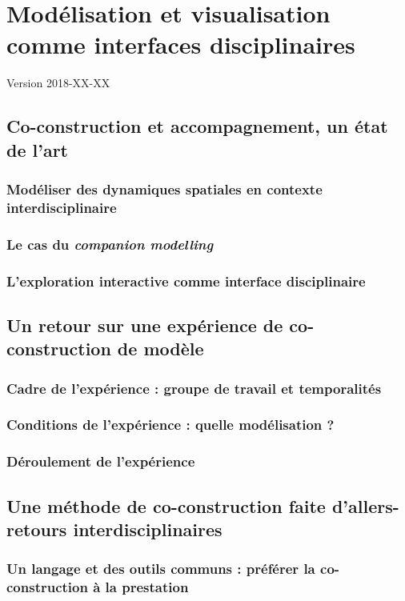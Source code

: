 \chapter{Modélisation et visualisation comme interfaces disciplinaires}
\label{chap:chap1}
\begin{center}
	{\large Version 2018-XX-XX}	\end{center}
\minitoc

\section{Co-construction et accompagnement, un état de l'art}
\subsection{Modéliser des dynamiques spatiales en contexte interdisciplinaire}
\subsection{Le cas du \textit{companion modelling}}
\subsection{L'exploration interactive comme interface disciplinaire}

\section{Un retour sur une expérience de co-construction de modèle}
\subsection{Cadre de l'expérience : groupe de travail et temporalités}
\subsection{Conditions de l'expérience : quelle modélisation ?}
\subsection{Déroulement de l'expérience}

\section{Une méthode de co-construction faite d'allers-retours interdisciplinaires}
\subsection{Un langage et des outils communs : préférer la co-construction à la prestation}
